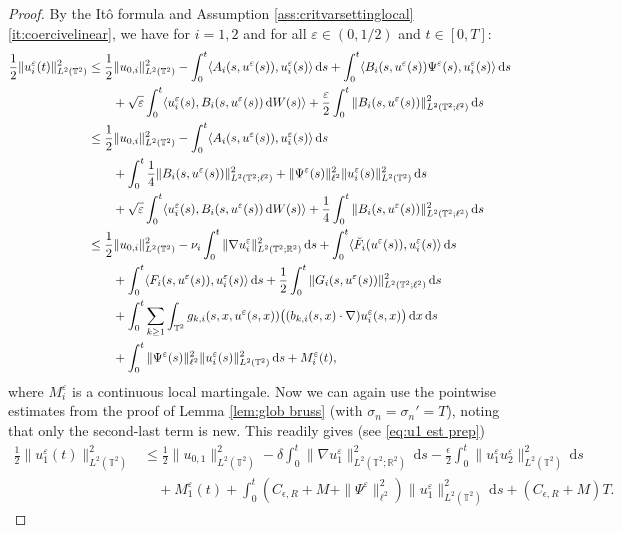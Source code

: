 \documentclass{amsart}
\newcommand{\dd}{\,\mathrm{d}}
\newcommand{\<}{\langle}
\newcommand{\?}{\rangle}
\newcommand{\bphieps}{\Psi^{\eps}}
\newcommand{\Tor}{\mathbb{T}}
\renewcommand{\Tor}{\mathbb{T}^2}
\theoremstyle{plain}
\theoremstyle{remark}
\theoremstyle{plain}
\numberwithin{equation}{section}
\def\R{{\mathbb R}}
\newcommand{\eps}{\varepsilon}
\begin{document}
 \begin{proof}
   By the It\^o formula \cite[(A.4)]{TV24} and Assumption \ref{ass:critvarsettinglocal}\ref{it:coercivelinear}, we have  for $i=1,2$ and for all $\eps\in(0,1/2)$ and $t\in[0,T]$: 
\begin{align*}
  \frac12 \|u_i^\eps(t)\|_{L^2(\Tor)}^2&\leq \frac12 \|u_{0,i} \|_{L^2(\Tor)}^2- \int_0^t\<A_i(s,u^\eps(s)),u_i^\eps(s)\?\dd s +  \int_0^t\<B_i(s,u^\eps(s))\bphieps(s),u_i^\eps(s)\?\dd s\notag\\
  &\qquad+ \sqrt{\eps}\int_0^t\<u_i^\eps(s),B_i(s,u^\eps(s))\dd W(s)\? +\frac{\eps}{2}\int_0^t\|B_i(s,u^\eps(s))\|_{L^2(\Tor;\ell^2)}^2\dd s \notag\\
  &\leq \frac12 \|u_{0,i}\|_{L^2(\Tor)}^2- \int_0^t\<A_i(s,u^\eps(s)),u_i^\eps(s)\?\dd s \\
  &\qquad+ \int_0^t \frac14\|B_i(s,u^\eps(s))\|_{L^2(\Tor;\ell^2)}^2+\|\bphieps(s)\|_{\ell^2}^2\|u_i^\eps(s)\|_{L^2(\Tor)}^2\dd s \notag\\ 
  &\qquad+ \sqrt{\eps} \int_0^t\<u_i^\eps(s),B_i(s,u^\eps(s))\dd W(s)\? +\frac{1}{4}\int_0^t\|B_i(s,u^\eps(s))\|_{L^2(\Tor;\ell^2)}^2\dd s \notag\\
   &\leq \frac12 \|u_{0,i} \|_{L^2(\Tor)}^2- \nu_i \int_0^t\|\nabla u_i^\eps \|_{L^2(\Tor;\R^2)}^2\dd s + \int_0^t\<\breve{F}_i(u^\eps(s)),u_i^\eps(s)\?\dd s \notag\\ 
   &\qquad+  \int_0^t\<{F}_i(s,u^\eps(s)),u_i^\eps(s)\? \dd s +\frac{1}{2}\int_0^t\|G_i(s,u^\eps(s))\|_{L^2(\Tor;\ell^2)}^2\dd s\notag\\
   &\qquad+ \int_0^t\sum_{k\geq 1}\int_{\Tor}g_{k,i}(s,x,u^\eps(s,x))\big((b_{k,i}(s,x)\cdot\nabla)u_i^\eps(s,x)\big)\dd x\dd s\notag\\
   &\qquad + \int_0^t \|\bphieps(s)\|_{\ell^2}^2\|u_i^\eps(s)\|_{L^2(\Tor)}^2\dd s +  M_i^\eps(t),  
\end{align*} 
where $M_i^\eps$ is a continuous local martingale.  
Now we can again use the pointwise estimates from the proof of Lemma \ref{lem:glob bruss} (with $\sigma_n=\sigma_n'=T$), noting that only the  second-last term is new. This readily gives (see \eqref{eq:u1 est prep})
\begin{align*}
   \tfrac12 \|u_1^\eps(t)\|_{L^2(\Tor)}^2 &\leq \tfrac12 \|u_{0,1}\|_{L^2(\Tor)}^2 -\delta\int_0^t\|\nabla u_1^\eps\|_{L^2(\Tor;\R^2)}^2\dd s-\frac{\epsilon}{2}\int_0^t\| u_1^\eps u_2^\eps\|_{L^2(\Tor)}^2 \dd s\\
   &\quad+ M_1^\eps(t)+ \int_0^t (C_{\epsilon,R}+M+\|\bphieps\|_{\ell^2}^2) \|u_1^\eps\|_{L^2(\Tor)}^2 \dd s+(C_{\epsilon,R}+M)T.

\end{align*}
\end{proof}
\end{document}

